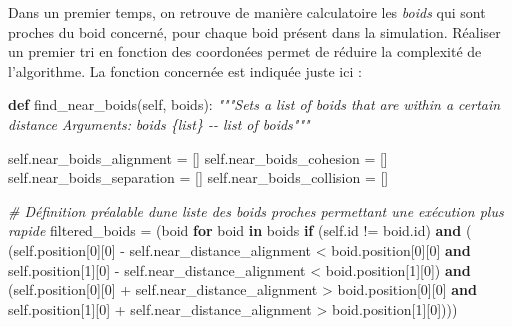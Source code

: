 \documentclass[
]{article}
\newenvironment{Shaded}{}{}
\newcommand{\BuiltInTok}[1]{#1}
\newcommand{\CommentTok}[1]{\textcolor[rgb]{0.38,0.63,0.69}{\textit{#1}}}
\newcommand{\ControlFlowTok}[1]{\textcolor[rgb]{0.00,0.44,0.13}{\textbf{#1}}}
\newcommand{\DecValTok}[1]{\textcolor[rgb]{0.25,0.63,0.44}{#1}}
\newcommand{\KeywordTok}[1]{\textcolor[rgb]{0.00,0.44,0.13}{\textbf{#1}}}
\newcommand{\NormalTok}[1]{#1}
\newcommand{\OperatorTok}[1]{\textcolor[rgb]{0.40,0.40,0.40}{#1}}
\newcommand{\VariableTok}[1]{\textcolor[rgb]{0.10,0.09,0.49}{#1}}
\begin{document}
Dans un premier temps, on retrouve de manière calculatoire les
\emph{boids} qui sont proches du boid concerné, pour chaque boid présent
dans la simulation. Réaliser un premier tri en fonction des coordonées
permet de réduire la complexité de l'algorithme. La fonction concernée
est indiquée juste ici :

\begin{Shaded}
\begin{Highlighting}[]
\KeywordTok{def}\NormalTok{ find\_near\_boids(}\VariableTok{self}\NormalTok{, boids):}
    \CommentTok{"""Sets a list of boids that are within a certain distance}
\CommentTok{    Arguments:}
\CommentTok{        boids \{list\} {-}{-} list of boids"""}

    \VariableTok{self}\NormalTok{.near\_boids\_alignment }\OperatorTok{=}\NormalTok{ []}
    \VariableTok{self}\NormalTok{.near\_boids\_cohesion }\OperatorTok{=}\NormalTok{ []}
    \VariableTok{self}\NormalTok{.near\_boids\_separation }\OperatorTok{=}\NormalTok{ []}
    \VariableTok{self}\NormalTok{.near\_boids\_collision }\OperatorTok{=}\NormalTok{ []}

\CommentTok{\# Définition préalable d\textquotesingle{}une liste des boids proches permettant une exécution plus rapide}
\NormalTok{    filtered\_boids }\OperatorTok{=}\NormalTok{ (boid }\ControlFlowTok{for}\NormalTok{ boid }\KeywordTok{in}\NormalTok{ boids }\ControlFlowTok{if}\NormalTok{ (}\VariableTok{self}\NormalTok{.}\BuiltInTok{id} \OperatorTok{!=}\NormalTok{ boid.}\BuiltInTok{id}\NormalTok{) }\KeywordTok{and}\NormalTok{ (}
\NormalTok{    (}\VariableTok{self}\NormalTok{.position[}\DecValTok{0}\NormalTok{][}\DecValTok{0}\NormalTok{] }\OperatorTok{{-}} \VariableTok{self}\NormalTok{.near\_distance\_alignment }\OperatorTok{\textless{}}\NormalTok{ boid.position[}\DecValTok{0}\NormalTok{][}\DecValTok{0}\NormalTok{] }\KeywordTok{and} \VariableTok{self}\NormalTok{.position[}\DecValTok{1}\NormalTok{][}\DecValTok{0}\NormalTok{] }\OperatorTok{{-}} \VariableTok{self}\NormalTok{.near\_distance\_alignment }\OperatorTok{\textless{}}\NormalTok{ boid.position[}\DecValTok{1}\NormalTok{][}\DecValTok{0}\NormalTok{]) }\KeywordTok{and} 
\NormalTok{    (}\VariableTok{self}\NormalTok{.position[}\DecValTok{0}\NormalTok{][}\DecValTok{0}\NormalTok{] }\OperatorTok{+} \VariableTok{self}\NormalTok{.near\_distance\_alignment }\OperatorTok{\textgreater{}}\NormalTok{ boid.position[}\DecValTok{0}\NormalTok{][}\DecValTok{0}\NormalTok{] }\KeywordTok{and} \VariableTok{self}\NormalTok{.position[}\DecValTok{1}\NormalTok{][}\DecValTok{0}\NormalTok{] }\OperatorTok{+} \VariableTok{self}\NormalTok{.near\_distance\_alignment }\OperatorTok{\textgreater{}}\NormalTok{ boid.position[}\DecValTok{1}\NormalTok{][}\DecValTok{0}\NormalTok{])))}


\end{Highlighting}
\end{Shaded}
\end{document}
